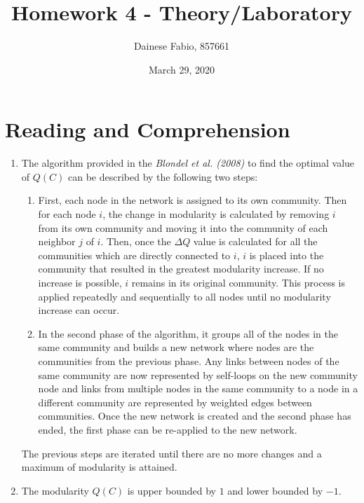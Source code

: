 \documentclass{article}
\title{Homework 4 - Theory/Laboratory}
\author{Dainese Fabio, 857661}
\date{March 29, 2020}
\begin{document}
\maketitle

\section{Reading and Comprehension}
    \begin{enumerate}
        \item The algorithm provided in the \textit{Blondel et al. (2008)} to find the optimal value of \(Q(C)\) can be described by the following two steps:
        \begin{enumerate}
            \item First, each node in the network is assigned to its own community. Then for each node \(i\), the change in modularity is calculated by removing \(i\) from its own community and moving it into the community of each neighbor \(j\) of \(i\).\newline
            Then, once the \(\Delta Q\) value is calculated for all the communities which are directly connected to \(i\), \(i\) is placed into the community that resulted in the greatest modularity increase. If no increase is possible, \(i\) remains in its original community. This process is applied repeatedly and sequentially to all nodes until no modularity increase can occur.
            
            \item In the second phase of the algorithm, it groups all of the nodes in the same community and builds a new network where nodes are the communities from the previous phase. Any links between nodes of the same community are now represented by self-loops on the new community node and links from multiple nodes in the same community to a node in a different community are represented by weighted edges between communities. Once the new network is created and the second phase has ended, the first phase can be re-applied to the new network.
        \end{enumerate}
        
        \noindent The previous steps are iterated until there are no more changes and a maximum of modularity is attained. 
        
        \item The modularity \(Q(C)\) is upper bounded by \(1\) and lower bounded by \(-1\).\newline
        

\end{enumerate}
\end{document}
